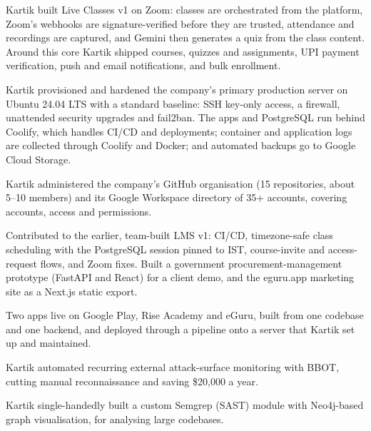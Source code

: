  Kartik built Live Classes v1 on Zoom: classes are orchestrated from
the platform, Zoom's webhooks are signature-verified before they are trusted, attendance and
recordings are captured, and Gemini then generates a quiz from the class content. Around this core
Kartik shipped courses, quizzes and assignments, UPI payment verification, push and email
notifications, and bulk enrollment.

 Kartik provisioned and hardened the company's primary production server on
Ubuntu 24.04 LTS with a standard baseline: SSH key-only access, a firewall, unattended security
upgrades and fail2ban. The apps and PostgreSQL run behind Coolify, which handles CI/CD and
deployments; container and application logs are collected through Coolify and Docker; and automated
backups go to Google Cloud Storage.

 Kartik administered the company's GitHub organisation (15 repositories,
about 5--10 members) and its Google Workspace directory of 35+ accounts, covering accounts, access
and permissions.

 Contributed to the earlier, team-built LMS v1: CI/CD, timezone-safe class
scheduling with the PostgreSQL session pinned to IST, course-invite and access-request flows, and
Zoom fixes. Built a government procurement-management prototype (FastAPI and React) for a client
demo, and the eguru.app marketing site as a Next.js static export.

 Two apps live on Google Play, Rise Academy and eGuru, built from one codebase and one
backend, and deployed through a pipeline onto a server that Kartik set up and maintained.


 Kartik automated recurring external attack-surface monitoring with
BBOT, cutting manual reconnaissance and saving \tld\$20,000 a year.

 Kartik single-handedly built a custom Semgrep (SAST) module with
Neo4j-based graph visualisation, for analysing large codebases.

